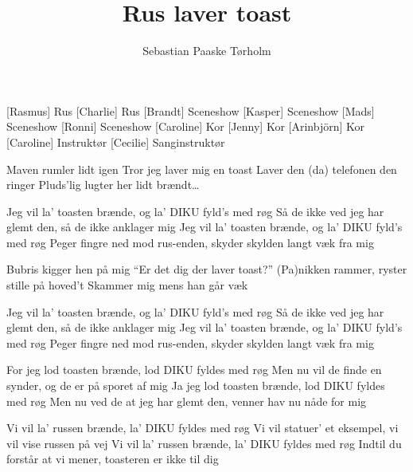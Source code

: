 \documentclass[a4paper,11pt]{article}
\title{Rus laver toast}
\author{Sebastian Paaske Tørholm}
\begin{document}
\maketitle

\begin{roles}
[Rasmus] Rus
[Charlie] Rus
[Brandt] Sceneshow
[Kasper] Sceneshow
[Mads] Sceneshow
[Ronni] Sceneshow
[Caroline] Kor
[Jenny] Kor
[Arinbjörn] Kor
[Caroline] Instruktør
[Cecilie] Sanginstruktør
\end{roles}

\begin{song}
%
Maven rumler lidt igen
Tror jeg laver mig en toast
Laver den (da) telefonen den ringer
Pluds'lig lugter her lidt brændt\ldots

Jeg vil la' toasten brænde, og la' DIKU fyld's med røg
Så de ikke ved jeg har glemt den, så de ikke anklager mig
Jeg vil la' toasten brænde, og la' DIKU fyld's med røg
Peger fingre ned mod rus-enden, skyder skylden langt væk fra mig

Bubris kigger hen på mig
``Er det dig der laver toast?''
(Pa)nikken rammer, ryster stille på hoved't
Skammer mig mens han går væk

Jeg vil la' toasten brænde, og la' DIKU fyld's med røg
Så de ikke ved jeg har glemt den, så de ikke anklager mig
Jeg vil la' toasten brænde, og la' DIKU fyld's med røg
Peger fingre ned mod rus-enden, skyder skylden langt væk fra mig


%
For jeg lod toasten brænde, lod DIKU fyldes med røg
Men nu vil de finde en synder, og de er på sporet af mig
Ja jeg lod toasten brænde, lod DIKU fyldes med røg
Men nu ved de at jeg har glemt den, venner hav nu nåde for mig

Vi vil la' russen brænde, la' DIKU fyldes med røg
Vi vil statuer' et eksempel, vi vil vise russen på vej
Vi vil la' russen brænde, la' DIKU fyldes med røg
Indtil du forstår at vi mener, toasteren er ikke til dig
\end{song}
\end{document}
